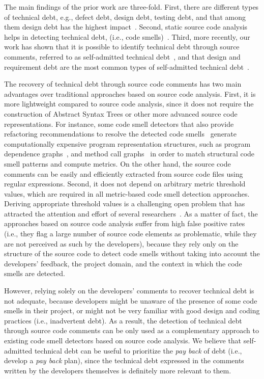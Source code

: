 \documentclass[10pt,journal,compsoc]{IEEEtran}
\newcommand{\SATD}{self-admitted technical debt\xspace}
\newcommand{\revised}[2]{{#1}}
\begin{document}
The main findings of the prior work are three-fold. First, there are different types of technical debt, e.g., defect debt, design debt, testing debt, and that among them design debt has the highest impact~\cite{Alves2014MTD,Marinescu2012IBM}. Second, static source code analysis helps in detecting technical debt, (i.e., code smells)~\cite{Marinescu2004ICSM,Marinescu2010CSMR,Zazworka2013CSE}. Third, more recently, our work has shown that it is possible to identify technical debt through source comments, referred to as  \SATD~\cite{Potdar2014ICSME}, and that design and requirement debt are the most common types of \SATD~\cite{Maldonado2015MTD}.

\revised{
The recovery of technical debt through source code comments has two main advantages over traditional approaches based on source code analysis. First, it is more lightweight compared to source code analysis, since it does not require the construction of Abstract Syntax Trees or other more advanced source code representations. For instance, some code smell detectors that also provide refactoring recommendations to resolve the detected code smells~\cite{Tsantalis:2011, Tsantalis:2015} generate computationally expensive program representation structures, such as program dependence graphs~\cite{Graf:2010}, and method call graphs~\cite{Ali:2012} in order to match structural code smell patterns and compute metrics. On the other hand, the source code comments can be easily and efficiently extracted from source code files using regular expressions. Second, it does not depend on arbitrary metric threshold values, which are required in all metric-based code smell detection approaches. Deriving appropriate threshold values is a challenging open problem that has attracted the attention and effort of several researchers~\cite{Oliveira2014CSMR,Fontana2015WETSoM,Fontana2015EMSE}. As a matter of fact, the approaches based on source code analysis suffer from high false positive rates~\cite{Fontana:2016} (i.e., they flag a large number of source code elements as problematic, while they are not perceived as such by the developers), because they rely only on the structure of the source code to detect code smells without taking into account the developers' feedback, the project domain, and the context in which the code smells are detected.

However, relying solely on the developers' comments to recover technical debt is not adequate, because developers might be unaware of the presence of some code smells in their project, or might not be very familiar with good design and coding practices (i.e., inadvertent debt).
As a result, the detection of technical debt through source code comments can be only used as a complementary approach to existing code smell detectors based on source code analysis.
We believe that \SATD can be useful to prioritize the \textit{pay back} of debt (i.e., develop a \textit{pay back} plan), since the technical debt expressed in the comments written by the developers themselves is definitely more relevant to them.
}{R1-3}
\end{document}
